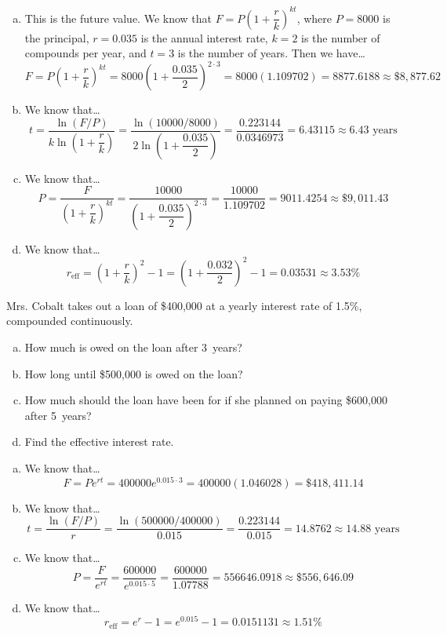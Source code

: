 \documentclass[11pt,letterpaper]{article}
\begin{document}
\sol
\begin{enumerate}[(a)]
\item This is the future value. We know that $F= P \left(1 + \dfrac{r}{k} \right)^{kt}$, where $P= 8000$ is the principal, $r= 0.035$ is the annual interest rate, $k= 2$ is the number of compounds per year, and $t= 3$ is the number of years. Then we have\dots
	\[
	F= P \left(1 + \dfrac{r}{k} \right)^{kt}= 8000 \left(1 + \dfrac{0.035}{2} \right)^{2 \cdot 3}= 8000(1.109702)= 8877.6188 \approx \$8,877.62
	\] \pspace

\item We know that\dots
	\[
	t= \dfrac{\ln(F/P)}{k \ln\left(1 + \dfrac{r}{k} \right)}= \dfrac{\ln(10000/8000)}{2 \ln \left(1 + \dfrac{0.035}{2} \right)}= \dfrac{0.223144}{0.0346973}= 6.43115 \approx 6.43 \text{ years}
	\] \pspace

\item We know that\dots
	\[
	P= \dfrac{F}{\left(1 + \dfrac{r}{k} \right)^{kt}}= \dfrac{10000}{\left(1 + \dfrac{0.035}{2} \right)^{2 \cdot 3}}= \dfrac{10000}{1.109702}= 9011.4254 \approx \$9,011.43
	\] \pspace

\item We know that\dots
	\[
	r_{\text{eff}}= \left(1 + \dfrac{r}{k} \right)^2 - 1= \left(1 + \dfrac{0.032}{2} \right)^2 - 1= 0.03531 \approx 3.53\%
	\]
\end{enumerate}



\newpage



 Mrs. Cobalt takes out a loan of \$400,000 at a yearly interest rate of 1.5\%, compounded continuously. 
	\begin{enumerate}[(a)]
	\item How much is owed on the loan after 3~years?
	\item How long until \$500,000 is owed on the loan?
	\item How much should the loan have been for if she planned on paying \$600,000 after 5~years?
	\item Find the effective interest rate.
	\end{enumerate} \pspace

\sol
\begin{enumerate}[(a)]
\item We know that\dots
	\[
	F= Pe^{rt}= 400000 e^{0.015 \cdot 3}= 400000 (1.046028)= \$418,411.14
	\] \pspace

\item We know that\dots
	\[
	t= \dfrac{\ln(F/P)}{r}= \dfrac{\ln(500000/400000)}{0.015}= \dfrac{0.223144}{0.015}= 14.8762 \approx 14.88 \text{ years}
	\] \pspace

\item We know that\dots
	\[
	P= \dfrac{F}{e^{rt}}= \dfrac{600000}{e^{0.015 \cdot 5}}= \dfrac{600000}{1.07788}= 556646.0918 \approx \$556,646.09
	\] \pspace

\item We know that\dots
	\[
	r_{\text{eff}}= e^r - 1= e^{0.015} - 1= 0.0151131 \approx 1.51\%
	\]
\end{enumerate}
\end{document}
